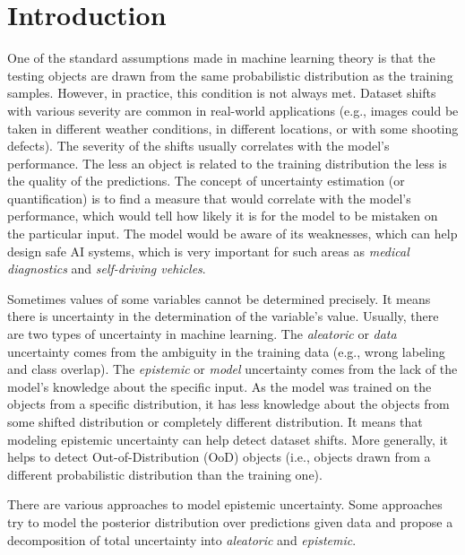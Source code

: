 \documentclass{article}
\begin{document}
\newpage

\setcounter{page}{1}
\tableofcontents
\newpage

\section{Introduction}
\label{introduction}
One of the standard assumptions made in machine learning theory is that the testing objects are drawn from the same probabilistic distribution as the training samples.
However, in practice, this condition is not always met.
Dataset shifts with various severity are common in real-world applications (e.g., images could be taken in different weather conditions, in different locations, or with some shooting defects).
The severity of the shifts usually correlates with the model's performance.
The less an object is related to the training distribution the less is the quality of the predictions.
The concept of uncertainty estimation (or quantification) is to find a measure that would correlate with the model's performance, which would tell how likely it is for the model to be mistaken on the particular input.
The model would be aware of its weaknesses, which can help design safe AI systems, which is very important for such areas as \textit{medical diagnostics} and \textit{self-driving vehicles}.

Sometimes values of some variables cannot be determined precisely.
It means there is uncertainty in the determination of the variable's value.
Usually, there are two types of uncertainty in machine learning.
The \textit{aleatoric} or \textit{data} uncertainty comes from the ambiguity in the training data (e.g., wrong labeling and class overlap).
The \textit{epistemic} or \textit{model} uncertainty comes from the lack of the model's knowledge about the specific input.
As the model was trained on the objects from a specific distribution, it has less knowledge about the objects from some shifted distribution or completely different distribution.
It means that modeling epistemic uncertainty can help detect dataset shifts. More generally, it helps to detect Out-of-Distribution (OoD) objects (i.e., objects drawn from a different probabilistic distribution than the training one).

There are various approaches to model epistemic uncertainty.
Some approaches try to model the posterior distribution over predictions given data and propose a decomposition of total uncertainty into \textit{aleatoric} and \textit{epistemic}.
\end{document}

